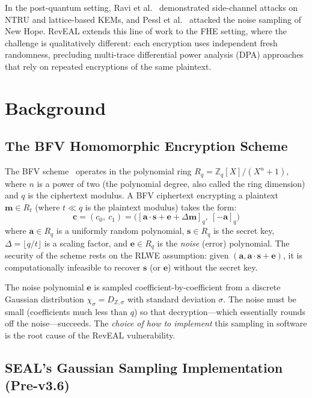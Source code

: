 \documentclass[sigconf,nonacm]{acmart}
\begin{document}
In the post-quantum setting, Ravi et al.~\cite{ravi2019} demonstrated side-channel
attacks on NTRU and lattice-based KEMs, and Pessl et al.~\cite{pessl2019} attacked
the noise sampling of New Hope. RevEAL extends this line of work to the FHE setting,
where the challenge is qualitatively different: each encryption uses independent fresh
randomness, precluding multi-trace differential power analysis (DPA) approaches that
rely on repeated encryptions of the same plaintext.

\section{Background}

\subsection{The BFV Homomorphic Encryption Scheme}

The BFV scheme~\cite{fan2012} operates in the polynomial ring
$R_q = \mathbb{Z}_q[X]/(X^n + 1)$, where $n$ is a power of two (the polynomial
degree, also called the ring dimension) and $q$ is the ciphertext modulus.
A BFV ciphertext encrypting a plaintext $\mathbf{m} \in R_t$
(where $t \ll q$ is the plaintext modulus) takes the form:
\[
  \mathbf{c} = (c_0,\ c_1) = \bigl([\mathbf{a} \cdot \mathbf{s} + \mathbf{e} + \Delta\mathbf{m}]_q,\
                                    [-\mathbf{a}]_q\bigr)
\]
where $\mathbf{a} \in R_q$ is a uniformly random polynomial, $\mathbf{s} \in R_q$
is the secret key, $\Delta = \lfloor q/t \rfloor$ is a scaling factor, and
$\mathbf{e} \in R_q$ is the \emph{noise} (error) polynomial. The security of the
scheme rests on the RLWE assumption: given $(\mathbf{a}, \mathbf{a}\cdot\mathbf{s} +
\mathbf{e})$, it is computationally infeasible to recover $\mathbf{s}$ (or
$\mathbf{e}$) without the secret key.

The noise polynomial $\mathbf{e}$ is sampled coefficient-by-coefficient from a
discrete Gaussian distribution $\chi_\sigma = D_{\mathbb{Z}, \sigma}$ with standard
deviation $\sigma$. The noise must be small (coefficients much less than $q$) so
that decryption---which essentially rounds off the noise---succeeds. The
\emph{choice of how to implement} this sampling in software is the root cause of
the RevEAL vulnerability.

\subsection{SEAL's Gaussian Sampling Implementation (Pre-v3.6)}
\end{document}
